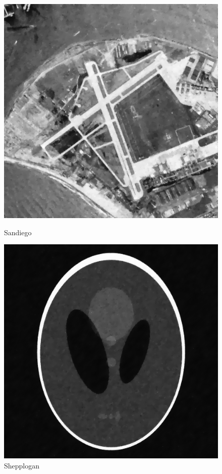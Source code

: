 \documentclass{article}
\begin{document}
    \phantom{}
    
    \begin{figure}[!htb]
      \includegraphics[scale=.45]{./edge_preserving_smoothing/sandiego/gaussian.png}
      \caption{Sandiego}
    \endminipage \hfill
      \includegraphics[scale=.45]{./edge_preserving_smoothing/shepplogan/gaussian.png}
      \caption{Shepplogan}
    \endminipage
    \end{figure}
    
\end{document}
